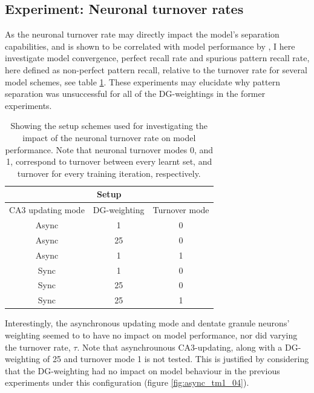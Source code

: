 \subsection{Experiment: Neuronal turnover rates}

As the neuronal turnover rate may directly impact the model's separation capabilities, and is shown to be correlated with model performance by \citep{Hattori2014}, I here investigate model convergence, perfect recall rate and spurious pattern recall rate, here defined as non-perfect pattern recall, relative to the turnover rate for several model schemes, see table \ref{table:turnover_schemes}. These experiments may elucidate why pattern separation was unsuccessful for all of the DG-weightings in the former experiments.

\begin{table}[]
\centering
\caption{Showing the setup schemes used for investigating the impact of the neuronal turnover rate on model performance. Note that neuronal turnover modes 0, and 1, correspond to turnover between every learnt set, and turnover for every training iteration, respectively.}
\label{table:turnover_schemes}
\begin{tabular}{|c|c|c|}
\hline
\multicolumn{3}{|c|}{Setup}                               \\ \hline
CA3 updating mode & DG-weighting & Turnover mode        \\ \hline
Async             & 1            & 0                      \\ \hline
Async             & 25           & 0                      \\ \hline
Async             & 1            & 1                      \\ \hline
Sync              & 1            & 0                      \\ \hline
Sync              & 25           & 0                      \\ \hline
Sync              & 25           & 1                      \\ \hline
\end{tabular}
\end{table}

Interestingly, the asynchronous updating mode and dentate granule neurons' weighting seemed to to have no impact on model performance, nor did varying the turnover rate, $\tau$. Note that asynchrounous CA3-updating, along with a DG-weighting of 25 and turnover mode 1 is not tested. This is justified by considering that the DG-weighting had no impact on model behaviour in the previous experiments under this configuration (figure \ref{fig:async_tm1_04}).

